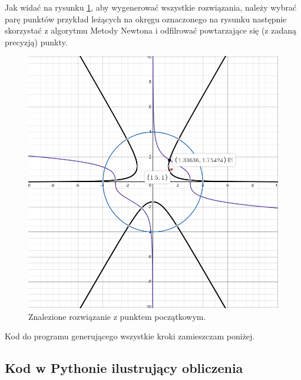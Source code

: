 \documentclass[a4paper,12pt]{article}
\begin{document}
     Jak widać na rysunku \ref{fig:task_three}, aby wygenerować wszystkie rozwiązania, należy wybrać parę punktów przykład leżących na okręgu oznaczonego na rysunku następnie skorzystać z algorytmu Metody Newtona i odfilrować powtarzające się (z zadaną precyzją) punkty.
    
    \begin{figure}[H]
        \centering
        \includegraphics[width=1\linewidth]{task_three.PNG}
        \caption{Znalezione rozwiązanie z punktem początkowym.}
        \label{fig:task_three}
    \end{figure}
    
    Kod do programu generującego wszystkie kroki zamieszczam poniżej.
    
    
    \subsection*{Kod w Pythonie ilustrujący obliczenia}
    
\end{document}

